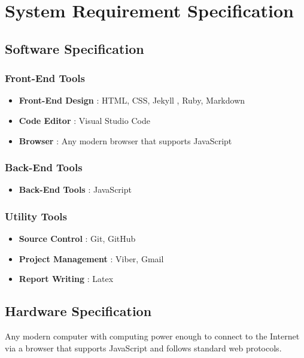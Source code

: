 
\chapter{System Requirement Specification}

\section{{\bf{Software Specification}}}


\subsection{{\bf{Front-End Tools}}}

\begin{itemize}
	\item \textbf{Front-End Design} : HTML, CSS, Jekyll , Ruby, Markdown
	\item \textbf{Code Editor} : Visual Studio Code
	\item \textbf{Browser} : Any modern browser that supports JavaScript
	
\end{itemize}


\subsection{{\bf{Back-End Tools}}}
\begin{itemize}
	\item \textbf{Back-End Tools} : JavaScript
\end{itemize}


\subsection{{\bf{Utility Tools}}}
\begin{itemize}
	\item \textbf{Source Control} : Git, GitHub
	\item \textbf{Project Management} : Viber, Gmail
	\item \textbf{Report Writing} : Latex
	
\end{itemize}


\section{{\bf{Hardware Specification}}}
Any modern computer with computing power enough to connect to the Internet via a browser that supports JavaScript and follows standard web protocols.